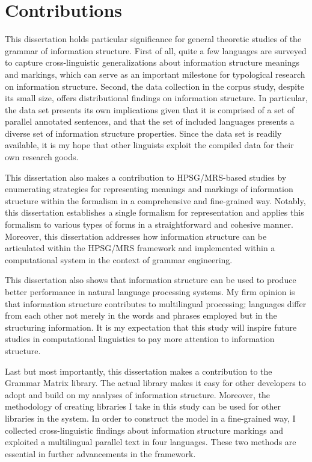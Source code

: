 \section{Contributions}
\label{15:sec:contributions}

This dissertation holds particular significance for general theoretic
studies of the grammar of information structure. First of all, quite a
few languages are surveyed to capture cross-linguistic generalizations
about information structure meanings and markings, which can serve as
an important milestone for typological research on information
structure. Second, the data collection in the corpus study, despite
its small size, offers distributional findings on information
structure. In particular, the data set presents its own implications
given that it is comprised of a set of parallel annotated sentences,
and that the set of included languages presents a diverse set of
information structure properties. Since the data set is readily
available, it is my hope that other linguists exploit the compiled
data for their own research goods.

This dissertation also makes a contribution to HPSG/MRS-based studies
by enumerating strategies for representing meanings and markings of
information structure within the formalism in a comprehensive and
fine-grained way.  Notably, this dissertation establishes a single
formalism for representation and applies this formalism to various
types of forms in a straightforward and cohesive manner. Moreover,
this dissertation addresses how information structure can be
articulated within the HPSG/MRS framework and implemented within a
computational system in the context of grammar engineering.



This dissertation also shows that information structure can be used to
produce better performance in natural language processing systems. My
firm opinion is that information structure contributes to multilingual
processing; languages differ from each other not merely in the words
and phrases employed but in the structuring information. It is my
expectation that this study will inspire future studies in
computational linguistics to pay more attention to information
structure.


Last but most importantly, this dissertation makes a contribution to
the \lingo Grammar Matrix library. The actual library makes it easy
for other developers to adopt and build on my analyses of information
structure.  Moreover, the methodology of creating libraries I take in
this study can be used for other libraries in the system.  In order to
construct the model in a fine-grained way, I collected
cross-linguistic findings about information structure markings and
exploited a multilingual parallel text in four languages. These two
methods are essential in further advancements in the \lingo framework.





